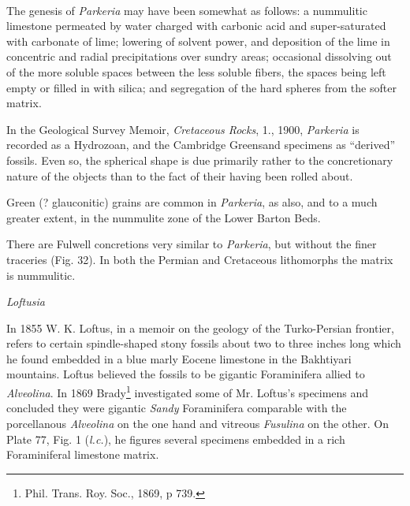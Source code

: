 \documentclass[a4paper, 12pt, oneside]{article}
\begin{document}
\paragraph{}
The genesis of \emph{Parkeria} may have been somewhat as follows: a nummulitic limestone permeated by water charged with carbonic acid and super-saturated with carbonate of lime; lowering of solvent power, and deposition of the lime in concentric and radial precipitations over sundry areas; occasional dissolving out of the more soluble spaces between the less soluble fibers, the spaces being left empty or filled in with silica; and segregation of the hard spheres from the softer matrix.

In the Geological Survey Memoir, \emph{Cretaceous Rocks}, 1., 1900, \emph{Parkeria} is recorded as a Hydrozoan, and the Cambridge Greensand specimens as ``derived'' fossils. Even so, the spherical shape is due primarily rather to the concretionary nature of the objects than to the fact of their having been rolled about.

Green (? glauconitic) grains are common in \emph{Parkeria}, as also, and to a much greater extent, in the nummulite zone of the Lower Barton Beds.

There are Fulwell concretions very similar to \emph{Parkeria}, but without the finer traceries (Fig. 32). In both the Permian and Cretaceous lithomorphs the matrix is nummulitic.

\bigskip
\centerline{\emph{Loftusia}}

In 1855 W. K. Loftus, in a memoir on the geology of the Turko-Persian frontier, refers to certain spindle-shaped stony fossils about two to three inches long which he found embedded in a blue marly Eocene limestone in the Bakhtiyari mountains. Loftus believed the fossils to be gigantic Foraminifera allied to \emph{Alveolina}. In 1869 Brady\footnote{Phil. Trans. Roy. Soc., 1869, p 739.} investigated some of Mr. Loftus's specimens and concluded they were gigantic \emph{Sandy} Foraminifera comparable with the porcellanous \emph{Alveolina} on the one hand and vitreous \emph{Fusulina} on the other. On Plate 77, Fig. 1 (\emph{l.c.}), he figures several specimens embedded in a rich Foraminiferal limestone matrix.
\end{document}
